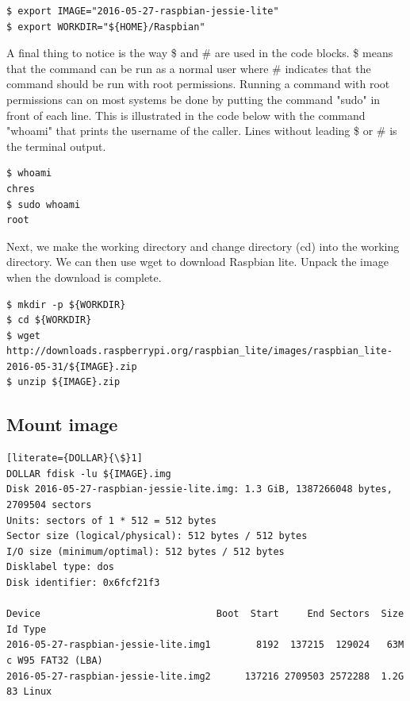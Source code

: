
\begin{lstlisting}[]
$ export IMAGE="2016-05-27-raspbian-jessie-lite"
$ export WORKDIR="${HOME}/Raspbian"
\end{lstlisting}
\FloatBarrier

A final thing to notice is the way \$ and \# are used in the code blocks. \$
means that the command can be run as a normal user where \# indicates that the
command should be run with root permissions.
Running a command with root permissions can on most systems be done by putting
the command "sudo" in front of each line. This is illustrated in the code below
with the command "whoami" that prints the username of the caller. Lines without
leading \$ or \# is the terminal output.

\begin{lstlisting}[]
$ whoami
chres
$ sudo whoami
root
\end{lstlisting}
\FloatBarrier

Next, we make the working directory and change directory (cd) into the working
directory. We can then use wget to download Raspbian lite. Unpack the image
when the download is complete.

\begin{lstlisting}[]
$ mkdir -p ${WORKDIR}
$ cd ${WORKDIR}
$ wget http://downloads.raspberrypi.org/raspbian_lite/images/raspbian_lite-2016-05-31/${IMAGE}.zip
$ unzip ${IMAGE}.zip
\end{lstlisting}
\FloatBarrier

\subsection{Mount image}



\begin{lstlisting}[literate={DOLLAR}{\$}1]
DOLLAR fdisk -lu ${IMAGE}.img
Disk 2016-05-27-raspbian-jessie-lite.img: 1.3 GiB, 1387266048 bytes, 2709504 sectors
Units: sectors of 1 * 512 = 512 bytes
Sector size (logical/physical): 512 bytes / 512 bytes
I/O size (minimum/optimal): 512 bytes / 512 bytes
Disklabel type: dos
Disk identifier: 0x6fcf21f3

Device                               Boot  Start     End Sectors  Size Id Type
2016-05-27-raspbian-jessie-lite.img1        8192  137215  129024   63M  c W95 FAT32 (LBA)
2016-05-27-raspbian-jessie-lite.img2      137216 2709503 2572288  1.2G 83 Linux
\end{lstlisting}
\FloatBarrier

